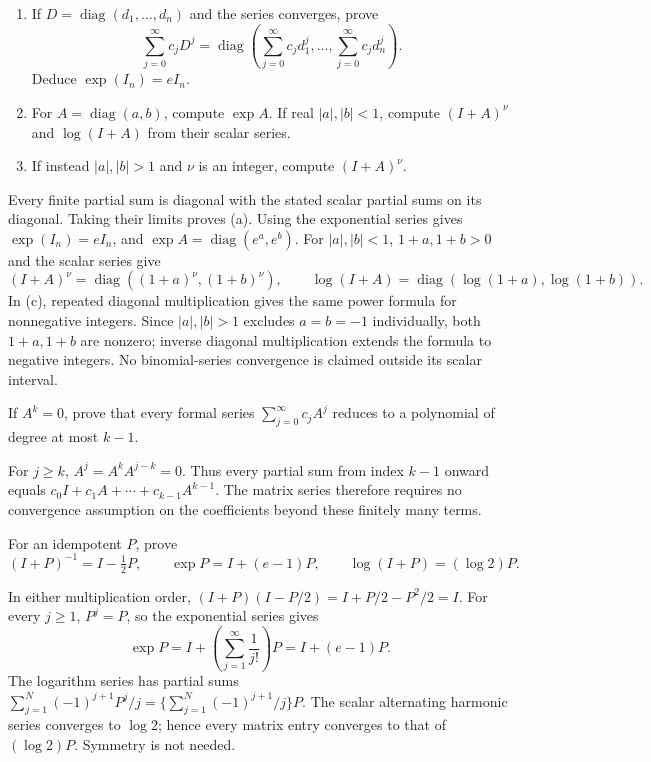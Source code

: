 \begin{problem}\label{ex:09:diagonal-functions}
\begin{enumerate}
\item If \(D=\operatorname{diag}(d_1,\ldots,d_n)\) and the series converges,
prove
\[
 \sum_{j=0}^\infty c_jD^j
 =\operatorname{diag}\left(\sum_{j=0}^\infty c_jd_1^j,\ldots,
                           \sum_{j=0}^\infty c_jd_n^j\right).
\]
Deduce \(\exp(I_n)=eI_n\).
\item For \(A=\operatorname{diag}(a,b)\), compute \(\exp A\).
If real \(|a|,|b|<1\), compute \((I+A)^\nu\) and \(\log(I+A)\)
from their scalar series.
\item If instead \(|a|,|b|>1\) and \(\nu\) is an integer, compute
\((I+A)^\nu\).
\end{enumerate}
\end{problem}
\begin{solution}
Every finite partial sum is diagonal with the stated scalar partial sums
on its diagonal. Taking their limits proves (a).
Using the exponential series gives \(\exp(I_n)=eI_n\), and
\(\exp A=\operatorname{diag}(e^a,e^b)\).
For \(|a|,|b|<1\), \(1+a,1+b>0\) and the scalar series give
\[
 (I+A)^\nu=\operatorname{diag}((1+a)^\nu,(1+b)^\nu),\qquad
 \log(I+A)=\operatorname{diag}(\log(1+a),\log(1+b)).
\]
In (c), repeated diagonal multiplication gives the same power formula
for nonnegative integers. Since \(|a|,|b|>1\) excludes \(a=b=-1\)
individually, both \(1+a,1+b\) are nonzero; inverse diagonal
multiplication extends the formula to negative integers.
No binomial-series convergence is claimed outside its scalar interval.
\end{solution}

\begin{problem}\label{ex:09:nilpotent-functions}
If \(A^k=0\), prove that every formal series
\(\sum_{j=0}^\infty c_jA^j\) reduces to a polynomial of degree at most
\(k-1\).
\end{problem}
\begin{solution}
For \(j\geqslant k\), \(A^j=A^kA^{j-k}=0\).
Thus every partial sum from index \(k-1\) onward equals
\(c_0I+c_1A+\cdots+c_{k-1}A^{k-1}\).
The matrix series therefore requires no convergence assumption on the
coefficients beyond these finitely many terms.
\end{solution}

\begin{problem}\label{ex:09:idempotent-functions}
For an idempotent \(P\), prove
\[
 (I+P)^{-1}=I-\tfrac12P,\qquad
 \exp P=I+(e-1)P,\qquad
 \log(I+P)=(\log2)P .
\]
\end{problem}
\begin{solution}
In either multiplication order,
\((I+P)(I-P/2)=I+P/2-P^2/2=I\).
For every \(j\geqslant1\), \(P^j=P\), so the exponential series gives
\[
 \exp P=I+\left(\sum_{j=1}^\infty\frac1{j!}\right)P
       =I+(e-1)P.
\]
The logarithm series has partial sums
\(\sum_{j=1}^N(-1)^{j+1}P^j/j
=\{\sum_{j=1}^N(-1)^{j+1}/j\}P\).
The scalar alternating harmonic series converges to \(\log2\);
hence every matrix entry converges to that of \((\log2)P\).
Symmetry is not needed.
\end{solution}

